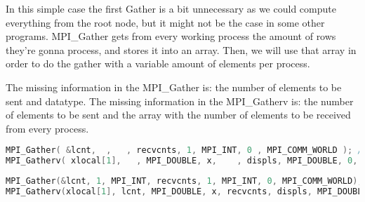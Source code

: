 \documentclass[a4paper, 10pt]{article}
\begin{document}
In this simple case the first Gather is a bit unnecessary as we could compute everything from the root node, but it might not be the case in some other programs. MPI\_Gather gets from every working process the amount of rows they're gonna process, and stores it into an array. Then, we will use that array in order to do the gather with a variable amount of elements per process.

The missing information in the MPI\_Gather is: the number of elements to be sent and datatype.
The missing information in the MPI\_Gatherv is: the number of elements to be sent and the array with the number of elements to be received from every process.
    \begin{lstlisting}[language=c, caption={Template S23, S24}]
MPI_Gather( &lcnt,  ,   , recvcnts, 1, MPI_INT, 0 , MPI_COMM_WORLD ); /* Statement S23 */
MPI_Gatherv( xlocal[1],   , MPI_DOUBLE, x,    , displs, MPI_DOUBLE, 0, MPI_COMM_WORLD ); /* Statement S24 */
    \end{lstlisting}

    \begin{lstlisting}[language=c, caption={Correct S23, S24}]
MPI_Gather(&lcnt, 1, MPI_INT, recvcnts, 1, MPI_INT, 0, MPI_COMM_WORLD); /* Statement S23 */
MPI_Gatherv(xlocal[1], lcnt, MPI_DOUBLE, x, recvcnts, displs, MPI_DOUBLE, 0, MPI_COMM_WORLD); /* S24 */
    \end{lstlisting}
\end{document}
